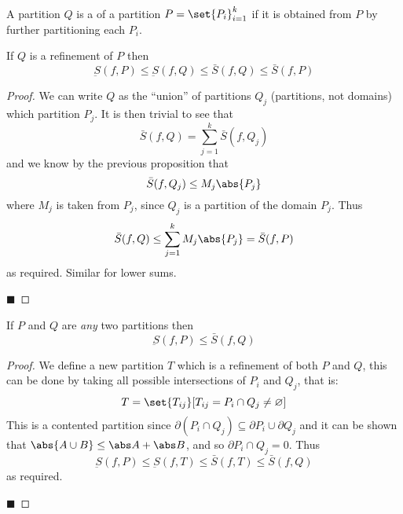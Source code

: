 \documentclass[10pt]{article}
\begin{document}
\begin{defn*}

    A partition $Q$ is a  of a partition $P=\set{P_i}_{i=1}^k$ if it is obtained from $P$ by further partitioning each $P_i$.

\end{defn*}

\begin{prop*}

    If $Q$ is a refinement of $P$ then
    \[ \underbar S(f,P) \leq \underbar S(f,Q) \leq \bar S(f,Q) \leq \bar S(f,P) \]

\end{prop*}

\begin{proof}

    We can write $Q$ as the ``union'' of partitions $Q_j$ (partitions, not domains) which partition $P_j$.
    It is then trivial to see that
    \[ \bar S(f,Q) = \sum_{j=1}^k \bar S(f,Q_j) \]
    and we know by the previous proposition that
    \[ \bar S(f,Q_j) \leq M_j\abs{P_j} \]
    where $M_j$ is taken from $P_j$, since $Q_j$ is a partition of the domain $P_j$.
    Thus
    \[ \bar S(f,Q) \leq \sum_{j=1}^k M_j\abs{P_j} = \bar S(f,P) \]
    as required.
    Similar for lower sums.

    \hfill$\blacksquare$

\end{proof}

\begin{prop*}

    If $P$ and $Q$ are \emph{any} two partitions then
    \[ \underbar S(f,P) \leq \bar S(f,Q) \]

\end{prop*}

\begin{proof}

    We define a new partition $T$ which is a refinement of both $P$ and $Q$, this can be done by taking all possible intersections of $P_i$ and $Q_j$, that is:
    \[ T = \set{T_{ij}}[T_{ij} = P_i\cap Q_j\neq\varnothing] \]
    This is a contented partition since $\partial(P_i\cap Q_j)\subseteq\partial P_i\cup\partial Q_j$ and it can be shown that $\abs{A\cup B}\leq\abs A+\abs B$, and so $\partial{P_i\cap Q_j}=0$.
    Thus
    \[ \underbar S(f,P) \leq \underbar S(f,T) \leq \bar S(f,T) \leq \bar S(f,Q) \]
    as required.

    \hfill$\blacksquare$

\end{proof}
\end{document}
